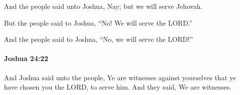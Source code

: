			\begin{versebox}
					\item[BHS] 
					\item[ASV] And the people said unto Joshua, Nay; but we will serve Jehovah.
					\item[NIV] But the people said to Joshua, “No! We will serve the LORD.”
					\item[NRSV] And the people said to Joshua, “No, we will serve the LORD!”
			\end{versebox}

		\paragraph{Joshua 24:22} %
			\label{JOSHUA-24-22}

			And Joshua said unto the people, Ye are witnesses against yourselves that ye have chosen you the LORD, to serve him. And they said, We are witnesses.


